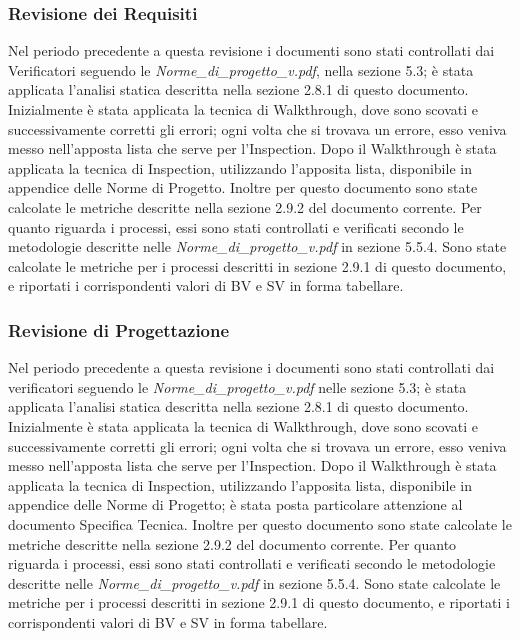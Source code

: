 \subsubsection{Revisione dei Requisiti}
Nel periodo precedente a questa revisione i documenti sono stati controllati dai Verificatori seguendo le \emph{Norme\_di\_progetto\_v\versioneNormeDiProgetto{}.pdf}, nella sezione 5.3; è stata applicata l'analisi statica descritta nella sezione 2.8.1 di questo documento.
Inizialmente è stata applicata la tecnica di Walkthrough, dove sono scovati e successivamente corretti gli errori; ogni volta che si trovava un errore, esso veniva messo nell'apposta lista che serve per l'Inspection.
Dopo il Walkthrough è stata applicata la tecnica di Inspection, utilizzando l'apposita lista, disponibile in appendice delle Norme di Progetto. Inoltre per questo documento sono state calcolate le metriche descritte nella sezione 2.9.2 del documento corrente.
Per quanto riguarda i processi, essi sono stati controllati e verificati secondo le metodologie descritte nelle  \emph{Norme\_di\_progetto\_v\versioneNormeDiProgetto{}.pdf} in sezione 5.5.4. Sono state calcolate le metriche per i processi descritti in sezione 2.9.1 di questo documento, e riportati i corrispondenti valori di BV e SV in forma tabellare.

\subsubsection{Revisione di Progettazione}
Nel periodo precedente a questa revisione i documenti sono stati controllati dai verificatori seguendo le \emph{Norme\_di\_progetto\_v\versioneNormeDiProgetto{}.pdf} nelle sezione 5.3; è stata applicata l'analisi statica descritta nella sezione 2.8.1 di questo documento.
Inizialmente è stata applicata la tecnica di Walkthrough, dove sono scovati e successivamente corretti gli errori; ogni volta che si trovava un errore, esso veniva messo nell'apposta lista che serve per l'Inspection.
Dopo il Walkthrough è stata applicata la tecnica di Inspection, utilizzando l'apposita lista, disponibile in appendice delle Norme di Progetto; è stata posta particolare attenzione al documento Specifica Tecnica. Inoltre per questo documento sono state calcolate le metriche descritte nella sezione 2.9.2 del documento corrente.
Per quanto riguarda i processi, essi sono stati controllati e verificati secondo le metodologie descritte nelle \emph{Norme\_di\_progetto\_v\versioneNormeDiProgetto{}.pdf} in sezione 5.5.4. Sono state calcolate le metriche per i processi descritti in sezione 2.9.1 di questo documento, e riportati i corrispondenti valori di BV e SV in forma tabellare.


